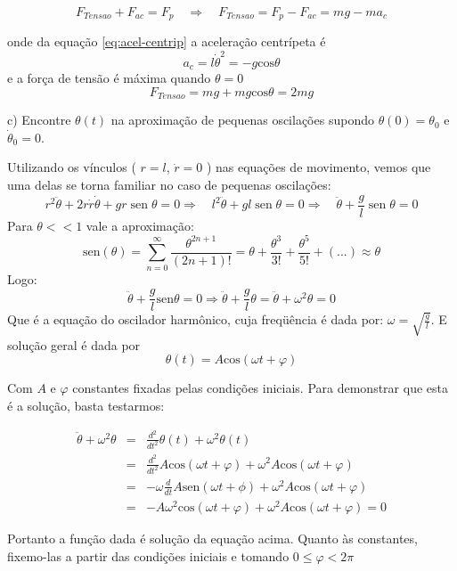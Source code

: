 \begin{enumerate}[start=1,label={\bfseries Q\arabic*.}]
$$
 F_{Tensao} + F_{ac} = F_{p}   \quad \Rightarrow \quad  F_{Tensao} = F_{p} - F_{ac} = mg - ma_{c}
$$

onde da equação \ref{eq:acel-centrip} a aceleração centrípeta é
$$
 a_{c} = l\dot{\theta}^{2} = - g \mathrm{cos} \theta
$$
e a força de tensão é máxima quando $\theta = 0$
$$
 F_{Tensao}  =  mg + m g \mathrm{cos} \theta = 2mg 
$$



c) Encontre $\theta(t)$ na aproximação de pequenas oscilações supondo $\theta(0) = \theta_{0}$ e $\dot{\theta}_{0} = 0$.

\resposta Utilizando os vínculos ( $r = l$, $\dot{r} = 0$ ) nas equações de movimento, vemos que uma delas se torna familiar no caso de pequenas oscilações:
$$
r^{2} \ddot{\theta} + 2r\dot{r} \dot{\theta} + gr \operatorname{sen} \theta = 0 \Rightarrow \quad l^{2} \ddot{\theta} + gl \operatorname{sen} \theta = 0 \Rightarrow \quad \ddot{\theta} + \frac{g}{l} \operatorname{sen} \theta = 0
$$
Para $\theta << 1$ vale a aproximação:
$$
\mathrm{sen}(\theta) = \sum_{n=0}^{\infty} \frac{\theta^{2n + 1}}{(2n+1)!} = \theta + \frac{\theta^{3}}{3!} + \frac{\theta^{5}}{5!} + (...) \approx \theta
$$
Logo:
$$
\ddot{\theta} + \frac{g}{l}\mathrm{sen} \theta  = 0 \Rightarrow \ddot{\theta} + \frac{g}{l} \theta =  \ddot{\theta} + \omega^{2} \theta = 0
$$
Que é a equação do oscilador harmônico, cuja freqüência é dada por: $\omega = \sqrt{\frac{g}{l}} $. E solução geral é dada por
$$
\theta (t) = A \mathrm{cos} (\omega t + \varphi)
$$

Com $A$ e $\varphi$ constantes fixadas pelas condições iniciais. Para demonstrar que esta é a solução, basta testarmos:

$$
\begin{array}{ccl}
  \ddot{\theta} + \omega^{2} \theta & = & \frac{d^{2}}{dt^{2}} \theta(t) + \omega^{2} \theta(t) \\
   & = & \frac{d^{2}}{dt^{2}} A \mathrm{cos}(\omega t + \varphi) + \omega^{2} A \mathrm{cos}(\omega t + \varphi)   \\
   & = & - \omega \frac{d}{dt} A \mathrm{sen} (\omega t + \phi) + \omega^{2} A \mathrm{cos}(\omega t + \varphi) \\
   & = & - A \omega^{2} \mathrm{cos} (\omega t + \varphi) + \omega^{2} A \mathrm{cos} (\omega t + \varphi) = 0
\end{array}
$$

Portanto a função dada é solução da equação acima. Quanto às constantes, fixemo-las a partir das condições iniciais e tomando $0 \leq \varphi < 2\pi $


\end{enumerate}
